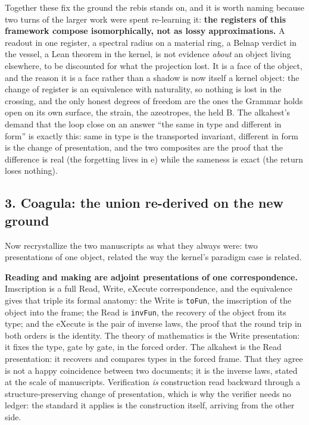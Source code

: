 \documentclass[12pt,a4paper]{article}
\begin{document}
Together these fix the ground the rebis stands on, and it is worth
naming because two turns of the larger work were spent re-learning it:
\textbf{the registers of this framework compose isomorphically, not as
lossy approximations.} A readout in one register, a spectral radius on a
material ring, a Belnap verdict in the vessel, a Lean theorem in the
kernel, is not evidence \emph{about} an object living elsewhere, to be
discounted for what the projection lost. It is a face of the object, and
the reason it is a face rather than a shadow is now itself a kernel
object: the change of register is an equivalence with naturality, so
nothing is lost in the crossing, and the only honest degrees of freedom
are the ones the Grammar holds open on its own surface, the strain, the
azeotropes, the held B. The alkahest's demand that the loop close on an
answer ``the same in type and different in form'' is exactly this: same
in type is the transported invariant, different in form is the change of
presentation, and the two composites are the proof that the difference
is real (the forgetting lives in e) while the sameness is exact (the
return loses nothing).

\hypertarget{coagula-the-union-re-derived-on-the-new-ground}{%
\subsection{3. Coagula: the union re-derived on the new
ground}\label{coagula-the-union-re-derived-on-the-new-ground}}

Now recrystallize the two manuscripts as what they always were: two
presentations of one object, related the way the kernel's paradigm case
is related.

\textbf{Reading and making are adjoint presentations of one
correspondence.} Imscription is a full Read, Write, eXecute
correspondence, and the equivalence gives that triple its formal
anatomy: the Write is \texttt{toFun}, the imscription of the object into
the frame; the Read is \texttt{invFun}, the recovery of the object from
its type; and the eXecute is the pair of inverse laws, the proof that
the round trip in both orders is the identity. The theory of mathematics
is the Write presentation: it fixes the type, gate by gate, in the
forced order. The alkahest is the Read presentation: it recovers and
compares types in the forced frame. That they agree is not a happy
coincidence between two documents; it is the inverse laws, stated at the
scale of manuscripts. Verification \emph{is} construction read backward
through a structure-preserving change of presentation, which is why the
verifier needs no ledger: the standard it applies is the construction
itself, arriving from the other side.
\end{document}
